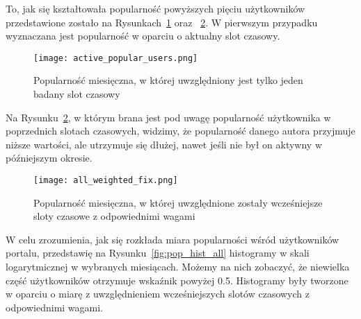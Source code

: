 \documentclass[polish,12pt]{aghthesis}
\begin{document}
To, jak się kształtowała popularność powyższych pięciu użytkowników przedstawione zostało na Rysunkach~\ref{fig:popularity_by_month} oraz ~\ref{fig:popularity_by_month_weighted}. W pierwszym przypadku wyznaczana jest popularność w oparciu o aktualny slot czasowy.



\begin{figure}[ht]
    \centering
    \texttt{[image: active\_popular\_users.png]}
    \caption[Popularność miesięczna - wszystkie interakcje]{Popularność miesięczna, w której uwzględniony jest tylko jeden badany slot czasowy}
    \label{fig:popularity_by_month}
\end{figure}



Na Rysunku~\ref{fig:popularity_by_month_weighted}, w którym brana jest pod uwagę popularność użytkownika w poprzednich slotach czasowych, widzimy, że popularność danego autora przyjmuje niższe wartości, ale utrzymuje się dłużej, nawet jeśli nie był on aktywny w późniejszym okresie.

\begin{figure}[ht]
    \centering
    \texttt{[image: all\_weighted\_fix.png]}
    \caption[Popularność miesięczna - wszystkie interakcje - wagi]{Popularność miesięczna, w której uwzględnione zostały wcześniejsze sloty czasowe z odpowiednimi wagami}
    \label{fig:popularity_by_month_weighted}
\end{figure}

\FloatBarrier

W celu zrozumienia, jak się rozkłada miara popularności wśród użytkowników portalu, przedstawię na Rysunku~\ref{fig:pop_hist_all} histogramy w skali logarytmicznej w wybranych miesiącach. Możemy na nich zobaczyć, że niewielka część użytkowników otrzymuje wskaźnik powyżej 0.5. Histogramy były tworzone w oparciu o miarę z uwzględnieniem wcześniejszych slotów czasowych z odpowiednimi wagami.
\end{document}
